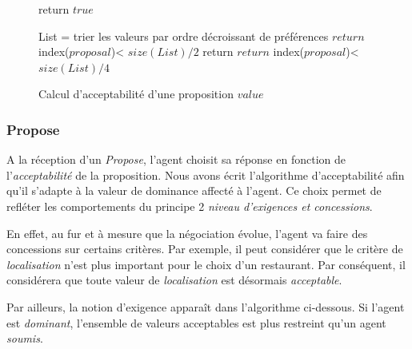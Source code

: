 	\begin{figure}[]
		\caption{\label{alg:pseudo} Calcul d'acceptabilité d'une proposition $value$}
		\begin{algorithmic}[1]
			\State return $true$
			\EndIf
			
			\State List = trier les valeurs par ordre décroissant de préférences
			\State $return$ index($proposal$)< $size(List)/2$
			\EndIf
			\State return $return$ index($proposal$)< $size(List)/4$
			\EndIf
			\EndFunction
		\end{algorithmic}
	\end{figure}
	
	
	 
	\subsubsection{Propose}
	A la réception d'un \emph{Propose}, l'agent choisit sa réponse en fonction de l'\emph{acceptabilité} de la proposition.
	Nous avons écrit l'algorithme d'acceptabilité afin qu'il s'adapte à la valeur de dominance affecté à l'agent. Ce choix permet de refléter les comportements du principe 2 \emph{niveau d'exigences et concessions}.
	
	En effet, au fur et à mesure que la négociation évolue, l'agent va faire des concessions sur certains critères. Par exemple, il peut considérer que le critère de \emph{localisation} n'est plus important pour le choix d'un restaurant. Par conséquent, il considérera que toute valeur de \emph{localisation} est désormais \emph{acceptable}.
	
	Par ailleurs, la notion d'exigence apparaît dans l'algorithme ci-dessous. Si l'agent est \emph{dominant}, l'ensemble de valeurs acceptables est plus restreint qu'un agent \emph{soumis}.

